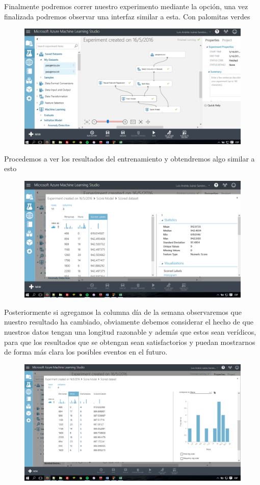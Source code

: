 \documentclass[11pt]{article}
\begin{document}
Finalmente podremos correr nuestro experimento mediante la opción, una vez finalizada podremos observar una interfaz similar a esta. Con palomitas verdes

\begin{figure}[htp]
\centering
\includegraphics[width=12cm]{6.jpg}
\label{fig:lion}
\end{figure}


Procedemos a ver los resultados del entrenamiento y obtendremos algo similar a esto 
 
\begin{figure}[htp]
\centering
\includegraphics[width=12cm]{8.jpg}
\label{fig:lion}
\end{figure}

Posteriormente si agregamos la columna día de la semana observaremos que nuestro resultado ha cambiado, obviamente debemos considerar el hecho de que nuestros datos tengan una longitud razonable y además que estos sean verídicos, para que los resultados que se obtengan sean satisfactorios y puedan mostrarnos de forma más clara los posibles eventos en el futuro.

\begin{figure}[htp]
\centering
\includegraphics[width=12cm]{9.jpg}
\label{fig:lion}
\end{figure}
\end{document}

